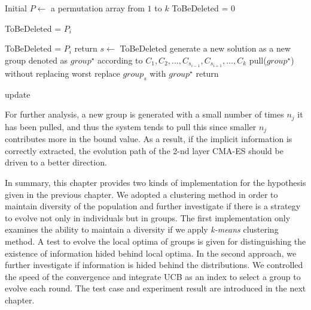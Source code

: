 \begin{algorithm}
  Initial $P\leftarrow $ a permutation array from $1$ to $k$\; 
  ToBeDeleted = $0$\;
  {
    {
	    ToBeDeleted = $P_i$\; 
    }  

   }
   {
      {
        {
	        ToBeDeleted = $P_i$\;
        } 
      } 
    } 
    { 
      return\; 
    } 
    \Else
  	{ 
      $s\leftarrow$ ToBeDeleted\; 
      generate a new solution as a new group	denoted as $group^\star$ according to $C_1, C_2,\ldots, C_{s_{i-1}}, C_{s_{i+1}},\ldots, C_k$ \; 
      { pull($group^\star$) without replacing worst\; }
	replace $group_{s}$ with $group^\star$\; return\; 
} 
\caption{update}
\end{algorithm}

For further analysis, a new group is generated with a small number of
times $n_j$ it has been pulled, and thus the system tends to pull this
since smaller $n_j$ contributes more in the bound value.
As a result, if the implicit information is correctly extracted, the
evolution path of the 2-nd layer CMA-ES should be driven to a better
direction.  

In summary, this chapter provides two kinds of implementation for
the hypothesis given in the previous chapter.
We adopted a clustering method in order to maintain diversity of the
population and further investigate if there is a strategy to evolve not
only in individuals but in groups.
The first implementation only examines the ability to maintain a
diversity if we apply \emph{k-means} clustering method.
A test to evolve the local optima of groups is given for distinguishing
the existence of information hided behind local optima.
In the second approach, we further investigate if information is
hided behind the distributions.
We controlled the speed of the convergence and integrate UCB as an index
to select a group to evolve each round.
The test case and experiment result are introduced in the next chapter.
